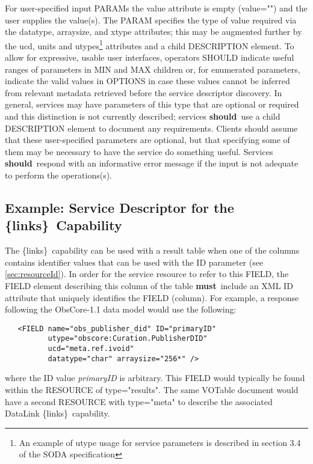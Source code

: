 \documentclass[11pt,a4paper]{ivoa}
\newcommand{\blinks}{\{links\}}
\newcommand{\attval}[2]{#1={\allowbreak}{"}#2{"}}
\newcommand{\rfcmust}{\textbf{must}}
\newcommand{\rfcshould}{\textbf{should}}
\begin{document}
For user-specified input PARAMs the value attribute is empty (\attval{value}{}) 
and the user supplies the value(s). The PARAM specifies the type of value required via 
the datatype, arraysize, and xtype attributes; this may be augmented further 
by the ucd, units and utypes\footnote{An example of utype usage for service 
parameters is described in section 3.4 of the SODA specification} attributes and a child DESCRIPTION element. To allow for expressive, usable user
interfaces, operators SHOULD indicate useful ranges of parameters in MIN and MAX children 
or, for enumerated parameters, indicate the valid values in OPTIONS in case 
these values cannot be inferred from relevant metadata retrieved 
before the service descriptor discovery. In general, services 
may have parameters of this type that are optional or required and this distinction is 
not currently described; services \rfcshould\ use a child DESCRIPTION element to document any 
requirements. Clients should assume that these user-specified parameters are optional, but 
that specifying some of them may be necessary to have the service do something useful. 
Services \rfcshould\ respond with an informative error message if the input is not adequate to 
perform the operations(s).

\subsection{Example: Service Descriptor for the \blinks\ Capability}

The \blinks\ capability can be used with a result table when one of the
columns contains identifier values that can be used with the ID parameter
(see \ref{sec:resourceId}).
In order for the service resource to refer to this FIELD,
the FIELD element describing this column of the table
\rfcmust\ include an XML ID attribute
that uniquely identifies the FIELD (column).
For example, a response following the ObsCore-1.1 data model
would use the following:
\begin{verbatim}
   <FIELD name="obs_publisher_did" ID="primaryID"
          utype="obscore:Curation.PublisherDID"
          ucd="meta.ref.ivoid"
          datatype="char" arraysize="256*" />
\end{verbatim}
where the ID value {\em primaryID\/} is arbitrary.
This FIELD would typically
be found within the RESOURCE of \attval{type}{results}. The same VOTable
document would have a second RESOURCE with \attval{type}{meta} to describe
the associated DataLink \blinks\ capability.
\end{document}
